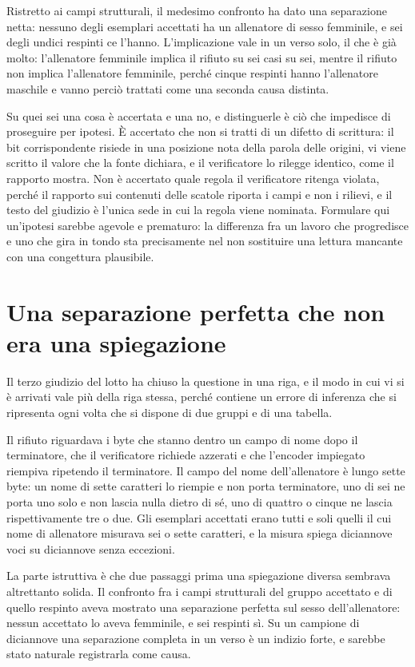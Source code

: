 Ristretto ai campi strutturali, il medesimo confronto ha dato una separazione netta: nessuno degli esemplari accettati ha un allenatore di sesso femminile, e sei degli undici respinti ce l'hanno. L'implicazione vale in un verso solo, il che è già molto: l'allenatore femminile implica il rifiuto su sei casi su sei, mentre il rifiuto non implica l'allenatore femminile, perché cinque respinti hanno l'allenatore maschile e vanno perciò trattati come una seconda causa distinta.

Su quei sei una cosa è accertata e una no, e distinguerle è ciò che impedisce di proseguire per ipotesi. È accertato che non si tratti di un difetto di scrittura: il bit corrispondente risiede in una posizione nota della parola delle origini, vi viene scritto il valore che la fonte dichiara, e il verificatore lo rilegge identico, come il rapporto mostra. Non è accertato quale regola il verificatore ritenga violata, perché il rapporto sui contenuti delle scatole riporta i campi e non i rilievi, e il testo del giudizio è l'unica sede in cui la regola viene nominata. Formulare qui un'ipotesi sarebbe agevole e prematuro: la differenza fra un lavoro che progredisce e uno che gira in tondo sta precisamente nel non sostituire una lettura mancante con una congettura plausibile.

\section{Una separazione perfetta che non era una spiegazione}

Il terzo giudizio del lotto ha chiuso la questione in una riga, e il modo in cui vi si è arrivati vale più della riga stessa, perché contiene un errore di inferenza che si ripresenta ogni volta che si dispone di due gruppi e di una tabella.

Il rifiuto riguardava i byte che stanno dentro un campo di nome dopo il terminatore, che il verificatore richiede azzerati e che l'encoder impiegato riempiva ripetendo il terminatore. Il campo del nome dell'allenatore è lungo sette byte: un nome di sette caratteri lo riempie e non porta terminatore, uno di sei ne porta uno solo e non lascia nulla dietro di sé, uno di quattro o cinque ne lascia rispettivamente tre o due. Gli esemplari accettati erano tutti e soli quelli il cui nome di allenatore misurava sei o sette caratteri, e la misura spiega diciannove voci su diciannove senza eccezioni.

La parte istruttiva è che due passaggi prima una spiegazione diversa sembrava altrettanto solida. Il confronto fra i campi strutturali del gruppo accettato e di quello respinto aveva mostrato una separazione perfetta sul sesso dell'allenatore: nessun accettato lo aveva femminile, e sei respinti sì. Su un campione di diciannove una separazione completa in un verso è un indizio forte, e sarebbe stato naturale registrarla come causa.

